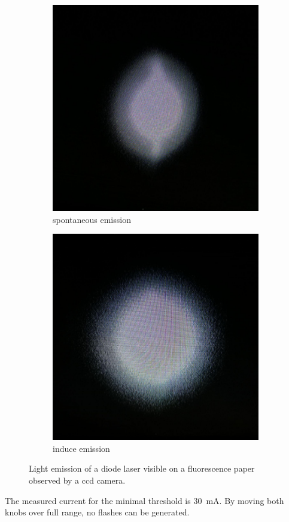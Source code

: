 \begin{figure}[h]
		\centering
		\begin{subfigure}[b]{0.45\textwidth}
				\begin{center}
						\includegraphics[width=0.7\linewidth]{./content/pictures/below_threshold.jpg}
						\caption{spontaneous emission}
				\label{fig:spontanious}
				\end{center}
		\end{subfigure}
		\begin{subfigure}[b]{0.45\textwidth}
				\begin{center}
						\includegraphics[width=0.7\linewidth]{./content/pictures/above_threshold.jpg}
						\caption{induce emission}
						\label{fig:induce}
				\end{center}
		\end{subfigure}
		\caption{Light emission of a diode laser visible on a fluorescence
		paper observed by a ccd camera.}
		\label{fig:emission}
\end{figure}
The measured current for the minimal threshold is \SI{30}{\milli\ampere}.
By moving both knobs over full range, no flashes can be generated.

